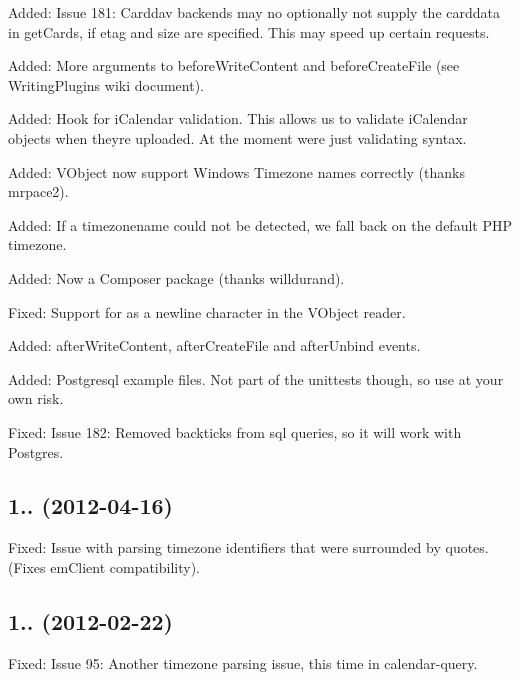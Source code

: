 \begin{DoxyItemize}
\item Added\+: Issue 181\+: Carddav backends may no optionally not supply the carddata in get\+Cards, if etag and size are specified. This may speed up certain requests.
\item Added\+: More arguments to before\+Write\+Content and before\+Create\+File (see Writing\+Plugins wiki document).
\item Added\+: Hook for i\+Calendar validation. This allows us to validate i\+Calendar objects when they\textquotesingle{}re uploaded. At the moment we\textquotesingle{}re just validating syntax.
\item Added\+: V\+Object now support Windows Timezone names correctly (thanks mrpace2).
\item Added\+: If a timezonename could not be detected, we fall back on the default P\+HP timezone.
\item Added\+: Now a Composer package (thanks willdurand).
\item Fixed\+: Support for  as a newline character in the V\+Object reader.
\item Added\+: after\+Write\+Content, after\+Create\+File and after\+Unbind events.
\item Added\+: Postgresql example files. Not part of the unittests though, so use at your own risk.
\item Fixed\+: Issue 182\+: Removed backticks from sql queries, so it will work with Postgres.
\end{DoxyItemize}

\subsection*{1.. (2012-\/04-\/16) }


\begin{DoxyItemize}
\item Fixed\+: Issue with parsing timezone identifiers that were surrounded by quotes. (Fixes em\+Client compatibility).
\end{DoxyItemize}

\subsection*{1.. (2012-\/02-\/22) }


\begin{DoxyItemize}
\item Fixed\+: Issue 95\+: Another timezone parsing issue, this time in calendar-\/query.
\end{DoxyItemize}

